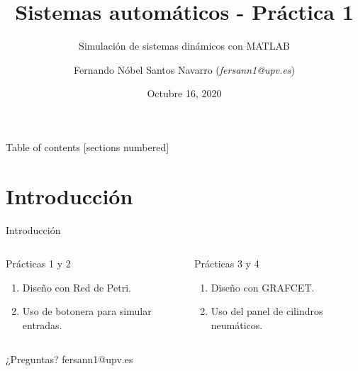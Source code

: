 \documentclass[9pt,table,aspectratio=169]{beamer}
\title{Sistemas automáticos - Práctica 1}
\subtitle{Simulación de sistemas dinámicos con MATLAB}
\author{Fernando Nóbel Santos Navarro (\textit{fersann1@upv.es})}
\date{Octubre 16, 2020}
\institute{Grado en Ingeniería en Tecnologías Industriales 2020-2021}
\begin{document}
\maketitle

\begin{frame}{Table of contents}
  [sections numbered]
  \tableofcontents[hideallsubsections]
\end{frame}

\section{Introducción}

\begin{frame}{Introducción}

  \begin{columns}[T,onlytextwidth]
    \begin{exampleblock}{Prácticas 1 y 2}
      \begin{enumerate}
        \item Diseño con Red de Petri.
        \item Uso de botonera para simular entradas.
      \end{enumerate}
    \end{exampleblock}

    \begin{alertblock}{Prácticas 3 y 4}
      \begin{enumerate}
        \item Diseño con GRAFCET.
        \item Uso del panel de cilindros neumáticos.
      \end{enumerate}
    \end{alertblock}

  \end{columns}
\end{frame}

\begin{frame}[standout]
  \vfill
  \vfill
  \vfill
  \huge
  ¿Preguntas?
  \vfill
  \vfill
  \normalsize
  \textnormal{fersann1@upv.es}
\end{frame}
\end{document}
